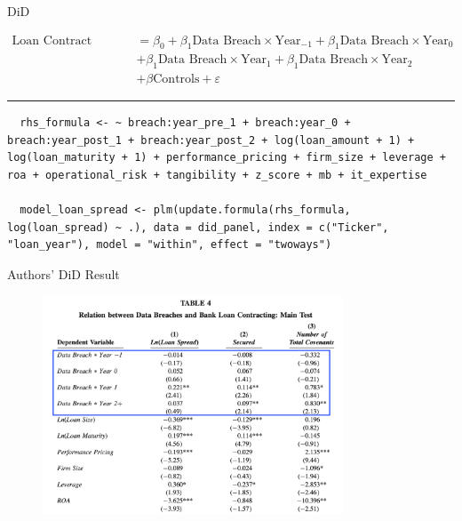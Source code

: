 \documentclass[13pt]{beamer}
\begin{document}
\begin{frame}[fragile]
  {DiD}
  \begin{scriptsize}
    \begin{align*}
      \text{Loan Contract Terms} & = \beta_0 + \beta_1\text{Data Breach} \times \text{Year}_{-1} + \beta_1\text{Data Breach} \times \text{Year}_{0} \\
                                 & + \beta_1\text{Data Breach} \times \text{Year}_{1} + \beta_1\text{Data Breach} \times \text{Year}_{2}            \\
                                 & + \beta \text{Controls} + \varepsilon
    \end{align*}
  \end{scriptsize}

  \rule{\textwidth}{1pt}

  \begin{lstlisting}
  rhs_formula <- ~ breach:year_pre_1 + breach:year_0 + breach:year_post_1 + breach:year_post_2 + log(loan_amount + 1) + log(loan_maturity + 1) + performance_pricing + firm_size + leverage + roa + operational_risk + tangibility + z_score + mb + it_expertise
  
  model_loan_spread <- plm(update.formula(rhs_formula, log(loan_spread) ~ .), data = did_panel, index = c("Ticker", "loan_year"), model = "within", effect = "twoways") \end{lstlisting}
\end{frame}

\begin{frame}
  {Authors' DiD Result}

  \begin{figure}
    \includegraphics[width=0.8\textwidth]{../tabs/main-result.png}
  \end{figure}
\end{frame}
\end{document}
